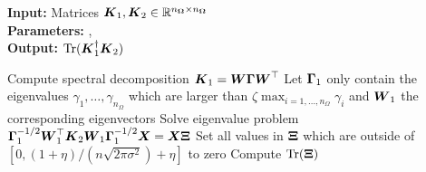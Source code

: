 \hspace*{\algorithmicindent} \textbf{Input:} Matrices $\boldsymbol{K}_1, \boldsymbol{K}_2 \in \mathbb{R}^{n_{\boldsymbol{\Omega}} \times n_{\boldsymbol{\Omega}}}$ \\
\hspace*{\algorithmicindent} \textbf{Parameters:} , \\
\hspace*{\algorithmicindent} \textbf{Output:} $\operatorname{Tr}(\boldsymbol{K}_1^{\dagger} \boldsymbol{K}_2)$
\begin{algorithmic}[1]
    \State Compute spectral decomposition $\boldsymbol{K}_1 = \boldsymbol{W} \boldsymbol{\Gamma} \boldsymbol{W}^{\top}$
    \State Let $\boldsymbol{\Gamma}_1$ only contain the eigenvalues $\gamma_1, \dots, \gamma_{n_{\Omega}}$ which are larger than $\zeta \max_{i=1, \dots, n_{\Omega}} \gamma_i$ and $\boldsymbol{W}_1$ the corresponding eigenvectors
    \State Solve eigenvalue problem $\boldsymbol{\Gamma}_1^{-1/2} \boldsymbol{W}_1^{\top} \boldsymbol{K}_2 \boldsymbol{W}_1 \boldsymbol{\Gamma}_1^{-1/2} \boldsymbol{X} = \boldsymbol{X} \boldsymbol{\Xi}$
    \State Set all values in $\boldsymbol{\Xi}$ which are outside of $[0, (1 + \eta) / (n \sqrt{2 \pi \sigma^2}) + \eta]$ to zero
    \State Compute $\operatorname{Tr}(\boldsymbol{\Xi})$
\end{algorithmic}
